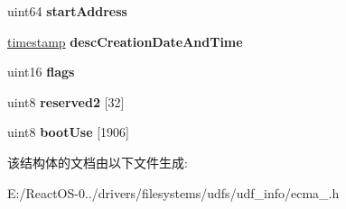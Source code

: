 \begin{DoxyCompactItemize}
\item 
\mbox{\label{struct___boot_desc_ac39770f7c0bbb8fe2add34fb804153e1}} 
uint64 {\bfseries start\+Address}
\item 
\mbox{\label{struct___boot_desc_a2718c75af412b35561bfcdc9cccb7568}} 
\hyperlink{structtimestamp}{timestamp} {\bfseries desc\+Creation\+Date\+And\+Time}
\item 
\mbox{\label{struct___boot_desc_aaeaa8671e3f3fec1c64f8f86eb69d04e}} 
uint16 {\bfseries flags}
\item 
\mbox{\label{struct___boot_desc_a9bda74bab3cd35891d0a9e83179f7b8b}} 
uint8 {\bfseries reserved2} \mbox{[}32\mbox{]}
\item 
\mbox{\label{struct___boot_desc_a8b2f24394e3d6fea592c3424b1474ec1}} 
uint8 {\bfseries boot\+Use} \mbox{[}1906\mbox{]}
\end{DoxyCompactItemize}


该结构体的文档由以下文件生成\+:\begin{DoxyCompactItemize}
\item 
E\+:/\+React\+O\+S-\/0../drivers/filesystems/udfs/udf\+\_\+info/ecma\+\_.\+h\end{DoxyCompactItemize}
